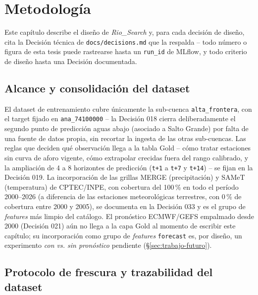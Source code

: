 \chapter{Metodolog\'ia}
\label{chap:metodologia}

Este cap\'itulo describe el dise\~no de \emph{Rio\_Search} y, para cada decisi\'on de dise\~no,
cita la Decisi\'on t\'ecnica de \texttt{docs/decisions.md} que la respalda -- todo n\'umero o
figura de esta tesis puede rastrearse hasta un \texttt{run\_id} de MLflow, y todo criterio de
dise\~no hasta una Decisi\'on documentada.

\section{Alcance y consolidaci\'on del dataset}

El dataset de entrenamiento cubre \'unicamente la sub-cuenca \texttt{alta\_frontera}, con el
target fijado en \texttt{ana\_74100000} -- la Decisi\'on 018 cierra deliberadamente el segundo
punto de predicci\'on aguas abajo (asociado a Salto Grande) por falta de una fuente de datos
propia, sin recortar la ingesta de las otras sub-cuencas. Las reglas que deciden qu\'e observaci\'on
llega a la tabla Gold -- c\'omo tratar estaciones sin curva de aforo vigente, c\'omo extrapolar
crecidas fuera del rango calibrado, y la ampliaci\'on de 4 a 8 horizontes de predicci\'on
(\texttt{t+1} a \texttt{t+7} y \texttt{t+14}) -- se fijan en la Decisi\'on 019. La incorporaci\'on
de las grillas MERGE (precipitaci\'on) y SAMeT (temperatura) de CPTEC/INPE, con cobertura del
100\,\% en todo el per\'iodo 2000--2026 (a diferencia de las estaciones meteorol\'ogicas
terrestres, con 0\,\% de cobertura entre 2000 y 2005), se documenta en la Decisi\'on 033 y es el
grupo de \emph{features} m\'as limpio del cat\'alogo. El pron\'ostico ECMWF/GEFS empalmado desde
2000 (Decisi\'on 021) a\'un no llega a la capa Gold al momento de escribir este cap\'itulo; su
incorporaci\'on como grupo de \emph{features} \texttt{forecast} es, por dise\~no, un experimento
\emph{con vs. sin pron\'ostico} pendiente (\S\ref{sec:trabajo-futuro}).

\section{Protocolo de frescura y trazabilidad del dataset}

